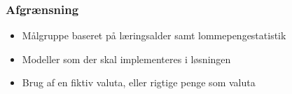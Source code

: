 
\begin{frame}
\frametitle{Afgrænsning}
    \begin{itemize}
        \item{Målgruppe baseret på læringsalder samt lommepengestatistik}
        \vspace{\baselineskip}
        \item{Modeller som der skal implementeres i løsningen}
        \vspace{\baselineskip}
        \item{Brug af en fiktiv valuta, eller rigtige penge som valuta}
    \end{itemize}
\end{frame}
    
